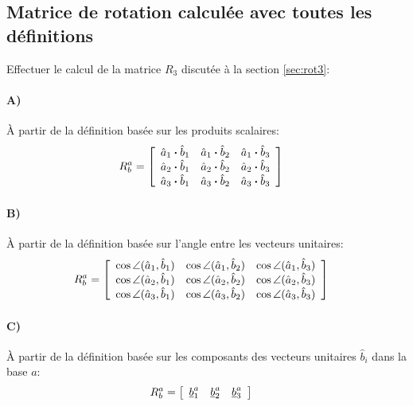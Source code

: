 
\subsection{Matrice de rotation calculée avec toutes les définitions}

Effectuer le calcul de la matrice $R_3$ discutée à la section \ref{sec:rot3}:

\paragraph{A)} À partir de la définition basée sur les produits scalaires:
\begin{align}
	R_b^a &=
	\left[ \begin{array}{c c c}
			   \hat{a}_1 \bullet \hat{b}_1  &  \hat{a}_1 \bullet \hat{b}_2  &  \hat{a}_1 \bullet \hat{b}_3 \\
			   \hat{a}_2 \bullet \hat{b}_1  &  \hat{a}_2 \bullet \hat{b}_2  &  \hat{a}_2 \bullet \hat{b}_3 \\
			   \hat{a}_3 \bullet \hat{b}_1  &  \hat{a}_3 \bullet \hat{b}_2  &  \hat{a}_3 \bullet \hat{b}_3
	\end{array} \right]
\end{align}
\paragraph{B)} À partir de la définition basée sur l'angle entre les vecteurs unitaires:
\begin{align}
	R_b^a &=
	\left[ \begin{array}{c c c}
			   \cos \angle (\hat{a}_1 , \hat{b}_1)  &  \cos \angle (\hat{a}_1 , \hat{b}_2)  &  \cos \angle (\hat{a}_1 , \hat{b}_3) \\
			   \cos \angle (\hat{a}_2 , \hat{b}_1)  &  \cos \angle (\hat{a}_2 , \hat{b}_2)  &  \cos \angle (\hat{a}_2 , \hat{b}_3) \\
			   \cos \angle (\hat{a}_3 , \hat{b}_1)  &  \cos \angle (\hat{a}_3 , \hat{b}_2)  &  \cos \angle (\hat{a}_3 , \hat{b}_3)
	\end{array} \right]
\end{align}
\paragraph{C)} À partir de la définition basée sur les composants des vecteurs unitaires $\hat{b}_i$ dans la base $a$:
\begin{align}
	R_b^a &=
	\left[ \begin{array}{c c c}
			   \col{b}_1^a &  \col{b}_2^a & \col{b}_3^a
	\end{array} \right]
\end{align}
